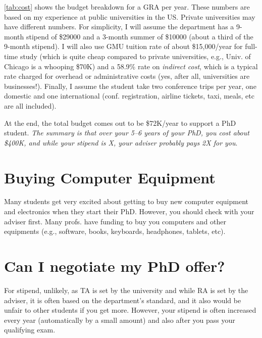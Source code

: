 \documentclass[oneside,11pt]{book}
\newcommand{\mycomment}[3][\color{blue}]{{#1{{#2}: {#3}}}}
\newcommand{\tvn}[1]{\mycomment{TVN}{#1}}{}
\begin{document}
\autoref{tab:cost} shows the budget breakdown for a GRA per year.
These numbers are based on my experience at public universities in the US. Private universities may have different numbers.  For simplicity, I will assume the department has a 9-month stipend of \$29000 and a 3-month summer of \$10000 (about a third of the 9-month stipend). I will also use GMU tuition rate of about \$15,000/year for full-time study (which is quite cheap compared to private universities, e.g., Univ. of Chicago is a whooping \$70K) and a 58.9\% rate on \emph{indirect cost}, which is a typical rate charged for overhead or administrative costs (yes, after all, universities are businesses!).  Finally, I assume the student take two conference trips per year, one domestic and one international (conf. registration, airline tickets, taxi, meals, etc are all included).

At the end, the total budget comes out to be \$72K/year to support a PhD student. \emph{The summary is that over your 5--6 years of your PhD, you cost about \$400K, and while your stipend is X, your adviser probably pays 2X for you}.




\section{Buying Computer Equipment}\label{sec:buying-equipment} Many students get very excited about getting to buy new computer equipment and electronics when they start their PhD. However, you should check with your adviser first.  Many profs. have funding to buy you computers and other equipments (e.g., software, books, keyboards, headphones, tablets, etc).

\section{Can I negotiate my PhD offer?}\label{sec:negotiate}
For stipend, unlikely, as TA is set by the university and while RA is set by the adviser, it is often based on the department's standard, and it also would be unfair to other students if you get more. However, your stipend is often increased every year (automatically by a small amount) and also after you pass your qualifying exam.
\end{document}
